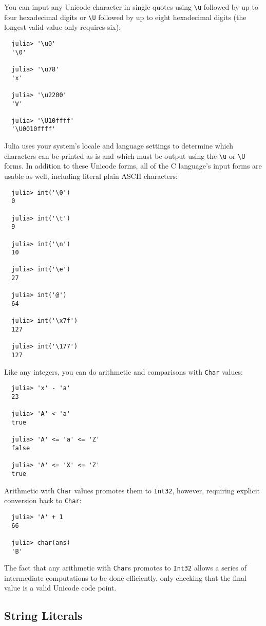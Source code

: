 \documentclass{article}
\begin{document}
You can input any Unicode character in single quotes using \verb|\u| followed by up to four hexadecimal digits or \verb|\U| followed by up to eight hexadecimal digits (the longest valid value only requires six):
\begin{verbatim}
  julia> '\u0'
  '\0'

  julia> '\u78'
  'x'

  julia> '\u2200'
  '∀'

  julia> '\U10ffff'
  '\U0010ffff'
\end{verbatim}
Julia uses your system's locale and language settings to determine which characters can be printed as-is and which must be output using the \verb|\u| or \verb|\U| forms.
In addition to these Unicode forms, all of the C language's input forms are usable as well, including literal plain ASCII characters:
\begin{verbatim}
  julia> int('\0')
  0

  julia> int('\t')
  9

  julia> int('\n')
  10

  julia> int('\e')
  27

  julia> int('@')
  64

  julia> int('\x7f')
  127

  julia> int('\177')
  127
\end{verbatim}
Like any integers, you can do arithmetic and comparisons with \verb|Char| values:
\begin{verbatim}
  julia> 'x' - 'a'
  23

  julia> 'A' < 'a'
  true

  julia> 'A' <= 'a' <= 'Z'
  false

  julia> 'A' <= 'X' <= 'Z'
  true
\end{verbatim}
Arithmetic with \verb|Char| values promotes them to \verb|Int32|, however, requiring explicit conversion back to \verb|Char|:
\begin{verbatim}
  julia> 'A' + 1
  66

  julia> char(ans)
  'B'
\end{verbatim}
The fact that any arithmetic with \verb|Char|s promotes to \verb|Int32| allows a series of intermediate computations to be done efficiently, only checking that the final value is a valid Unicode code point.

\subsection{String Literals}
\end{document}

